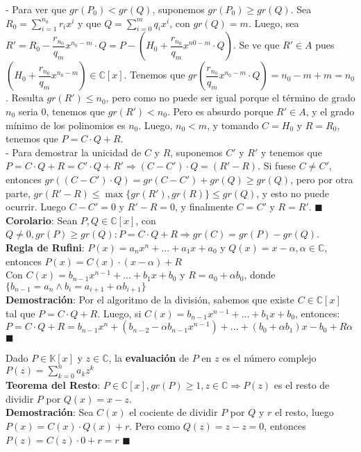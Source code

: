 \documentclass[11pt,a4paper]{article}
\newcommand*{\QEDA}{\null\nobreak\hfill\ensuremath{\blacksquare}}
\begin{document}
- Para ver que $gr(P_0) < gr(Q)$, suponemos $gr(P_0) \geq gr(Q)$. Sea $R_0 = \sum_{i=1}^{n_0} r_ix^i$ y que $Q = \sum_{i=0}^{m} q_ix^i$, con $gr(Q) = m$. Luego, sea $R' = R_0 - \dfrac{r_{n_0}}{q_m} x^{n_0-m} \cdot Q = P - \left(H_0 + \dfrac{r_{n_0}}{q_m} x^{n0-m}\cdot Q \right)$. Se ve que $R' \in A$ pues $\left(H_0 + \dfrac{r_{n_0}}{q_m} x^{n_0-m}\right) \in \mathbb{C}[x]$. Tenemos que $gr\left(\dfrac{r_{n_0}}{q_m} x^{n_0-m}\cdot Q \right) = n_0 - m + m = n_0$. Resulta $gr(R') \leq n_0$, pero como no puede ser igual porque el t\'ermino de grado $n_0$ seria 0, tenemos que $gr(R') < n_0$. Pero es absurdo porque $R'\in A$, y el grado m\'inimo de los polinomios es $n_0$. Luego, $n_0 < m$, y tomando $C=H_0$ y $R=R_0$, tenemos que $P = C \cdot Q + R$.\\
- Para demostrar la unicidad de $C$ y $R$, suponemos $C'$ y $R'$ y tenemos que $P = C\cdot Q + R = C'\cdot Q + R' \Rightarrow (C-C')\cdot Q = (R' - R)$. Si fuese $C \not = C'$, entonces $gr((C-C') \cdot Q) = gr(C-C') + gr(Q) \geq gr(Q)$, pero por otra parte, $gr(R'-R) \leq \max\{gr(R'), gr(R)\} \leq gr(Q)$, y esto no puede ocurrir. Luego $C-C' = 0$ y $R'-R=0$, y finalmente $C=C'$ y $R=R'$. \QEDA\\

\noindent \textbf{Corolario}: Sean $P,Q \in \mathbb{C}[x]$, con $Q\not=0, gr(P)\geq gr(Q) : P=C\cdot Q + R \Rightarrow gr(C) = gr(P) - gr(Q)$.\\

\noindent \textbf{Regla de Rufini}: $P(x) = a_nx^n + ... + a_1x + a_0$ y $Q(x)=x-\alpha, \alpha\in\mathbb{C}$, entonces $P(x) = C(x) \cdot (x-\alpha) + R$\\ Con $C(x) = b_{n-1}x^{n-1}+...+b_1x+b_0$ y $R = a_0 + \alpha b_0$, donde $\{b_{n-1} = a_n \land b_i = a_{i+1} + \alpha b_{i+1}\}$\\ \textbf{Demostraci\'on}: Por el algoritmo de la divisi\'on, sabemos que existe $C \in \mathbb{C}[x]$ tal que $P = C\cdot Q + R$. Luego, si $C(x) = b_{n-1}x^{n-1} + ... + b_1x + b_0$, entonces:\\ \indent \indent \indent \indent $P = C\cdot Q + R = b_{n-1}x^n + (b_{n-2} - \alpha b_{n-1}x^{n-1}) + ... + (b_0 + \alpha b_1)x - b_0 + R \alpha$ \QEDA

\noindent Dado $P\in\mathbb{K}[x]$ y $z \in \mathbb{C}$, la \textbf{evaluaci\'on} de $P$ en $z$ es el n\'umero complejo $\displaystyle{P(z) = \sum_{k=0}^na_kz^k}$\\

\noindent \textbf{Teorema del Resto}: $P\in\mathbb{C}[x], gr(P) \geq 1, z \in \mathbb{C} \Rightarrow P(z)$ es el resto de dividir $P$ por $Q(x)=x-z$. \\
\textbf{Demostraci\'on}: Sea $C(x)$ el cociente de dividir $P$ por $Q$ y $r$ el resto, luego $P(x)=C(x)\cdot Q(x) + r$. Pero como $Q(z)=z-z=0$, entonces $P(z)=C(z)\cdot 0 + r = r$ \QEDA\\
\end{document}
